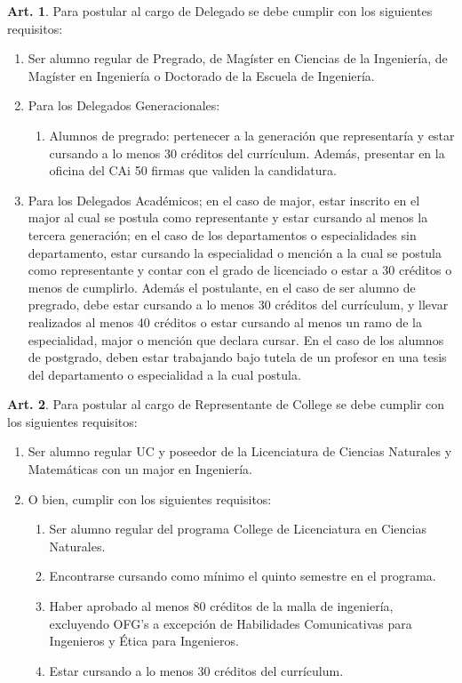 \documentclass[letterpaper,11pt]{article}
\theoremstyle{definition}%
\newtheorem{art}{Art.} %
\begin{document}
\begin{art}\label{requisitosDelegados}
	Para postular al cargo de Delegado se debe cumplir con los siguientes requisitos:
	\begin{enumerate}
		\item Ser alumno regular de Pregrado, de Magíster en Ciencias de la Ingeniería, de Magíster en Ingeniería o Doctorado de la Escuela de Ingeniería.
		\item Para los Delegados Generacionales:
		      \begin{enumerate}
			      \item Alumnos de pregrado: pertenecer a la generación que representaría y estar cursando a lo menos 30 créditos del currículum. Además, presentar en la oficina del CAi 50 firmas que validen la candidatura.
		      \end{enumerate}
		\item Para los Delegados Académicos; en el caso de major, estar inscrito en el major al cual se postula como representante y estar cursando al menos la tercera generación; en el caso de los departamentos o especialidades sin departamento, estar cursando la especialidad o mención a la cual se postula como representante y contar con el grado de licenciado o estar a 30 créditos o menos de cumplirlo. Además el postulante, en el caso de ser alumno de pregrado, debe estar cursando a lo menos 30 créditos del currículum, y llevar realizados al menos 40 créditos o estar cursando al menos un ramo de la especialidad, major o mención que declara cursar. En el caso de los alumnos de postgrado, deben estar trabajando bajo tutela de un profesor en una tesis del departamento o especialidad a la cual postula.
	\end{enumerate}
\end{art}

\begin{art}\label{requisitosRepresentanteCollege}
	Para postular al cargo de Representante de College se debe cumplir con los siguientes requisitos:
	\begin{enumerate}
		\item Ser alumno regular UC y poseedor de la Licenciatura de Ciencias Naturales y Matemáticas con un major en Ingeniería.
		\item O bien, cumplir con los siguientes requisitos:
		      \begin{enumerate}
			      \item Ser alumno regular del programa College de Licenciatura en Ciencias Naturales.
			      \item Encontrarse cursando como mínimo el quinto semestre en el programa.
			      \item Haber aprobado al menos 80 créditos de la malla de ingeniería, excluyendo OFG’s a excepción de Habilidades Comunicativas para Ingenieros y Ética para Ingenieros.
			      \item Estar cursando a lo menos 30 créditos del currículum.
		      \end{enumerate}
	\end{enumerate}
\end{art}
\end{document}
